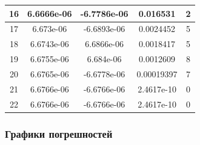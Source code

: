 \documentclass{article}
\begin{document}
\begin{table}[!h]
\begin{tabular}{|c|c|c|c|c|}
						16 & 6.6666e-06 & -6.7786e-06 & 0.016531   & 2  \\ \hline
						17 & 6.673e-06  & -6.6893e-06 & 0.0024452  & 5  \\ \hline
						18 & 6.6743e-06 & 6.6866e-06  & 0.0018417  & 5  \\ \hline
						19 & 6.6755e-06 & 6.684e-06   & 0.0012609  & 8  \\ \hline
						20 & 6.6765e-06 & -6.6778e-06 & 0.00019397 & 7  \\ \hline
						21 & 6.6766e-06 & -6.6766e-06 & 2.4617e-10 & 0  \\ \hline
						22 & 6.6766e-06 & -6.6766e-06 & 2.4617e-10 & 0  \\ \hline
					\end{tabular}
				\end{table}
			\newpage
			\subsubsection{Графики погрешностей}
			
\end{document}
